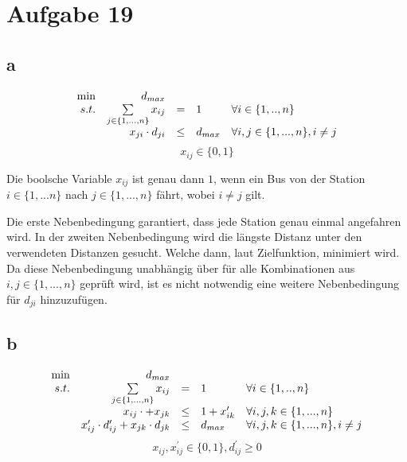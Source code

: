 \documentclass[10pt]{article}
\begin{document}
  \section*{Aufgabe 19}
    \subsection*{a}
      \begin{displaymath}
        \begin{array}{ r r c l l }
          \min & d_{max} & & & \\
          s.t. & \sum\limits_{j\in \{1,...,n\}} x_{ij} & = & 1 & \forall 
            i\in \{1,..,n\}\\
            & x_{ji}\cdot d_{ji} &\leq& d_{max} & \forall i,j \in \{1,...,n\}, i\neq j \\
        \end{array}
      \end{displaymath}
      \begin{displaymath}
        x_{ij}\in\{0,1\}
      \end{displaymath}

      Die boolsche Variable $x_{ij}$ ist genau dann $1$, wenn ein Bus von der
      Station $i\in \{1,...n\}$ nach $j \in \{1,...,n\}$ fährt, wobei $i\neq j$
      gilt.

      Die erste Nebenbedingung garantiert, dass jede Station genau einmal angefahren
      wird. In der zweiten Nebenbedingung wird die längste Distanz unter den
      verwendeten Distanzen gesucht. Welche dann, laut Zielfunktion, minimiert
      wird. Da diese Nebenbedingung unabhängig über für alle Kombinationen aus
      $i,j\in \{1,...,n\}$ geprüft wird, ist es nicht notwendig eine weitere
      Nebenbedingung für $d_{ji}$ hinzuzufügen.


    \subsection*{b}
      \begin{displaymath}
        \begin{array}{ r r c l l }
          \min & d_{max} & & & \\
          s.t. & \sum\limits_{j\in \{1,...,n\}} x_{ij} & = & 1 & \forall 
            i\in \{1,..,n\}\\
            & x_{ij}\cdot + x_{jk} & \leq &1 + x_{ik}^{\prime} & \forall
                i,j,k \in \{1,...,n\} \\
            & x_{ij}^{\prime}\cdot d_{ij}^{\prime} + x_{jk} \cdot d_{jk}&\leq&
              d_{max} & \forall i,j,k \in \{1,...,n\}, i\neq j \\
        \end{array}
      \end{displaymath}
      \begin{displaymath}
        x_{ij},x_{ij}^{\prime}\in\{0,1\}, d_{ij}^{\prime} \geq 0
      \end{displaymath}
\end{document}
